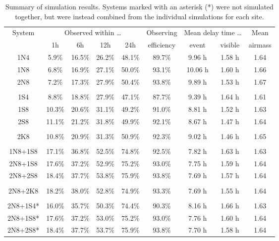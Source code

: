 \begin{colsection}
\begin{colsection}
\begin{table}[t]
\begin{center}
\begin{tabular}{c|cccc|c|cc|c}
    \multirow{2}{*}{System} &
    \multicolumn{4}{c|}{Observed within \ldots} &
    Observing &
    \multicolumn{2}{c|}{Mean delay time \ldots} &
    Mean
    \\
    &
    1h &
    6h &
    12h &
    24h &
    efficiency&
    event &
    visible &
    airmass
    \\
    \midrule
    1N4 & 5.9\% & 16.5\% & 26.2\% & 48.1\% & 89.7\% & 9.96 h & 1.58 h & 1.64 \\
    1N8 & 6.8\% & 16.9\% & 27.1\% & 50.0\% & 93.1\% & 10.06 h & 1.60 h & 1.66 \\
    2N8 & 7.2\% & 17.3\% & 27.9\% & 50.4\% & 93.8\% & 9.89 h & 1.53 h & 1.67 \\
    &&&&&&&&\\
    1S4 & 8.8\% & 18.8\% & 27.9\% & 47.1\% & 87.7\% & 9.39 h & 1.64 h & 1.61 \\
    1S8 & 10.3\% & 20.6\% & 31.1\% & 49.2\% & 91.0\% & 8.81 h & 1.52 h & 1.63 \\
    2S8 & 11.1\% & 21.2\% & 31.8\% & 49.9\% & 92.1\% & 8.67 h & 1.47 h & 1.64 \\
    &&&&&&&&\\
    2K8 & 10.8\% & 20.9\% & 31.3\% & 50.9\% & 92.3\% & 9.02 h & 1.46 h & 1.65 \\
    &&&&&&&&\\
    1N8+1S8 & 17.1\% & 36.8\% & 52.5\% & 74.8\% & 92.5\% & 7.82 h & 1.63 h & 1.63 \\
    2N8+1S8 & 17.6\% & 37.2\% & 52.9\% & 75.2\% & 93.0\% & 7.75 h & 1.59 h & 1.64 \\
    2N8+2S8 & 18.4\% & 37.7\% & 53.8\% & 75.9\% & 93.8\% & 7.69 h & 1.57 h & 1.64 \\
    &&&&&&&&\\
    2N8+2K8 & 18.2\% & 38.0\% & 52.8\% & 74.9\% & 93.3\% & 7.69 h & 1.55 h & 1.64 \\
    &&&&&&&&\\
    2N8+1S4* & 16.0\% & 35.7\% & 50.3\% & 74.4\% & 90.3\% & 8.16 h & 1.66 h & 1.63 \\
    2N8+1S8* & 17.6\% & 37.2\% & 53.0\% & 75.2\% & 93.0\% & 7.76 h & 1.60 h & 1.64 \\
    2N8+2S8* & 18.4\% & 37.7\% & 53.7\% & 75.9\% & 93.8\% & 7.70 h & 1.58 h & 1.64 \\

    \end{tabular}
    \end{center}
    \caption[GW simulation results summary table]{
        Summary of simulation results. Systems marked with an asterisk (*) were not simulated together, but were instead combined from the individual simulations for each site.
    }\label{tab:gw_sim_results}
    \end{table}


\end{colsection}
\end{colsection}
